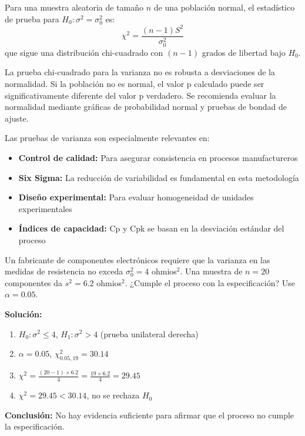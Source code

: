 \begin{theorem}
Para una muestra aleatoria de tamaño $n$ de una población normal, el estadístico de prueba para $H_0: \sigma^2 = \sigma_0^2$ es:
\[
\chi^2 = \frac{(n-1)S^2}{\sigma_0^2}
\]
que sigue una distribución chi-cuadrado con $(n-1)$ grados de libertad bajo $H_0$.
\end{theorem}

\begin{remark}
La prueba chi-cuadrado para la varianza no es robusta a desviaciones de la normalidad. Si la población no es normal, el valor p calculado puede ser significativamente diferente del valor p verdadero. Se recomienda evaluar la normalidad mediante gráficas de probabilidad normal y pruebas de bondad de ajuste.
\end{remark}

\begin{remark}
Las pruebas de varianza son especialmente relevantes en:
\begin{itemize}
    \item \textbf{Control de calidad:} Para asegurar consistencia en procesos manufactureros
    \item \textbf{Six Sigma:} La reducción de variabilidad es fundamental en esta metodología
    \item \textbf{Diseño experimental:} Para evaluar homogeneidad de unidades experimentales
    \item \textbf{Índices de capacidad:} Cp y Cpk se basan en la desviación estándar del proceso
\end{itemize}
\end{remark}

\begin{example}
Un fabricante de componentes electrónicos requiere que la varianza en las medidas de resistencia no exceda $\sigma_0^2 = 4$ ohmios$^2$. Una muestra de $n=20$ componentes da $s^2 = 6.2$ ohmios$^2$. ¿Cumple el proceso con la especificación? Use $\alpha = 0.05$.

\textbf{Solución:}
\begin{enumerate}
    \item $H_0: \sigma^2 \leq 4$, $H_1: \sigma^2 > 4$ (prueba unilateral derecha)
    \item $\alpha = 0.05$, $\chi^2_{0.05,19} = 30.14$
    \item $\chi^2 = \frac{(20-1) \times 6.2}{4} = \frac{19 \times 6.2}{4} = 29.45$
    \item $\chi^2 = 29.45 < 30.14$, no se rechaza $H_0$
\end{enumerate}
\textbf{Conclusión:} No hay evidencia suficiente para afirmar que el proceso no cumple la especificación.
\end{example}

